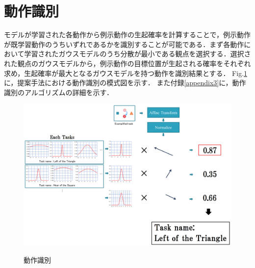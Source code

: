 \section{動作識別}

モデルが学習された各動作から例示動作の生起確率を計算することで，例示動作が既学習動作のうちいずれであるかを識別することが可能である．まず各動作において学習されたガウスモデルのうち分散が最小である観点を選択する．選択された観点のガウスモデルから，例示動作の目標位置が生起される確率をそれぞれ求め，生起確率が最大となるガウスモデルを持つ動作を識別結果とする．
Fig.\ref{figure:identification_model}に，提案手法における動作識別の模式図を示す．
また付録\ref{appendix3}に，動作識別のアルゴリズムの詳細を示す．
	\begin{figure}[h]
		\begin{center}
			\includegraphics[width=14cm]{chart10.png} \\ %
			\caption{動作識別}
			\label{figure:identification_model}
		\end{center}
	\end{figure}
